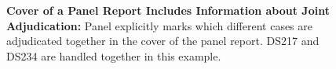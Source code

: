 \begin{figure}[t!]
  \centering
  \caption{\textbf{Cover of a Panel Report Includes Information about Joint Adjudication:}
      Panel explicitly marks which different cases are adjudicated together in the cover of the panel report. DS217 and DS234 are handled together in this example.
      }
  \label{fig:linked-cases}
\end{figure}
 
 
 

